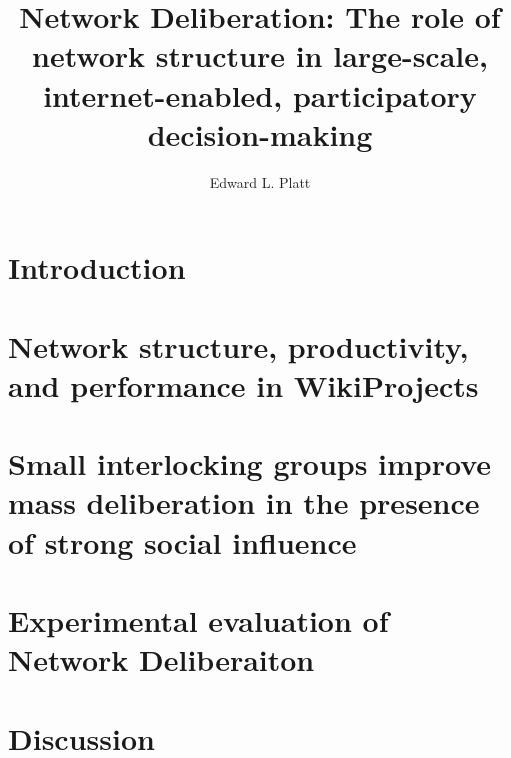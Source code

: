 \documentclass[thesis]{thesis-umich}
\title{Network Deliberation: The role of network structure in large-scale, internet-enabled, participatory decision-making}
\author{Edward L. Platt}
\begin{document}
\chapter{Introduction}
\label{chap:intro}


\chapter{Network structure, productivity, and performance in WikiProjects}
\label{chap:wp-prod-perf}


\chapter{Small interlocking groups improve mass deliberation in the presence
of strong social influence}
\label{chap:abm}


\chapter{Experimental evaluation of Network Deliberaiton}
\label{chap:experiment}


\chapter{Discussion}
\label{chap:discussion}

%

\appendix






\end{document}

